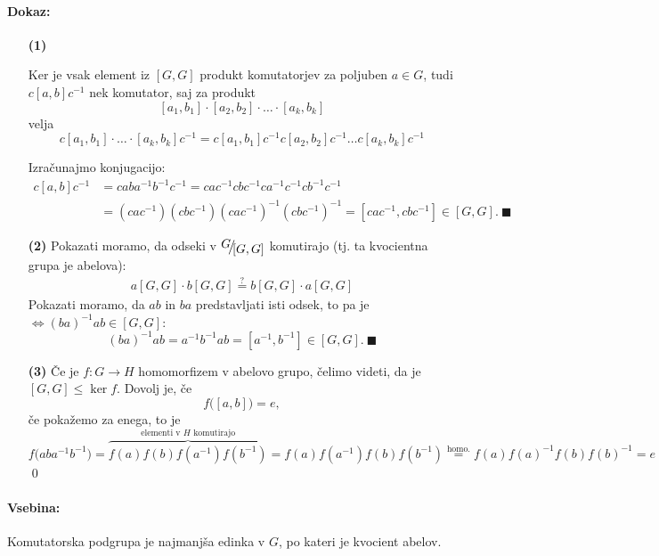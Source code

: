 \paragraph{Dokaz:}
\begin{itemize}
	\item[{\bf (1)}]{Ker je vsak element iz $[G,G]$ produkt komutatorjev za poljuben $a \in G$, tudi $c[a,b]c^{-1}$ nek komutator, saj za
		produkt
		\[
			[a_1, b_1] \cdot [a_2, b_2] \cdot \ldots \cdot [a_k, b_k]	
		\]velja
		\[
			c[a_1, b_1]\cdot\ldots\cdot[a_k,b_k]c^{-1} = c[a_1, b_1]c^{-1}c[a_2,b_2]c^{-1}\ldots c[a_k,b_k]c^{-1} 
		\]

		Izra\v cunajmo konjugacijo:
		\begin{align*}
			c[a,b]c^{-1} &= c ab a^{-1} b^{-1} c^{-1} = cac^{-1}c bc^{-1}c a^{-1}c^{-1}cb^{-1}c^{-1}\\
				&= (cac^{-1}) (cbc^{-1}) (cac^{-1})^{-1} (cbc^{-1})^{-1} = [cac^{-1}, cbc^{-1}] \in [G,G].\ \blacksquare
		\end{align*}}
	\item[{\bf (2)}]{Pokazati moramo, da odseki v $\quot{G}{[G,G]}$ komutirajo (tj. ta kvocientna grupa je abelova):
		\begin{align*}
			a[G,G] \cdot b[G,G] \stackrel{?}{=} b[G,G]\cdot a[G,G]
		\end{align*}
		Pokazati moramo, da $ab$ in $ba$ predstavljati isti odsek, to pa je $\iff (ba)^{-1}ab \in [G,G]$:
		\[
			(ba)^{-1} ab = a^{-1}b^{-1}ab = [a^{-1}, b^{-1}] \in [G,G].\ \blacksquare
		\]}
	\item[{\bf (3)}]{\v Ce je $f : G \to H$ homomorfizem v abelovo grupo, \v celimo videti, da je $[G,G] \leq \ker f$. Dovolj je, \v ce
		\[
			f\big([a,b]\big) = e,
		\]\v ce poka\v zemo za enega, to je
		\[
			f\big(aba^{-1}b^{-1}\big) = \overbrace{f(a)f(b)f(a^{-1})f(b^{-1})}^{\text{elementi v $H$ komutirajo}} =
				f(a) f(a^{-1}) f (b) f (b^{-1}) \stackrel{\text{homo.}}{=} f(a) f(a)^{-1} f(b) f(b)^{-1} = e
		\]\qed}
\end{itemize}

\ni \paragraph{Vsebina:} Komutatorska podgrupa je najmanj\v sa edinka v $G$, po kateri je kvocient abelov.

